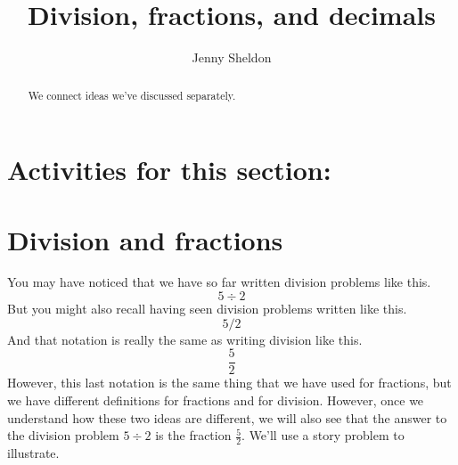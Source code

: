 \documentclass{ximera}
\title{Division, fractions, and decimals}
\author{Jenny Sheldon}
\begin{document}
\begin{abstract}
We connect ideas we've discussed separately.
\end{abstract}
\maketitle

\section{Activities for this section:} 

\section{Division and fractions}

You may have noticed that we have so far written division problems like this.
\[
5 \div 2
\]
But you might also recall having seen division problems written like this.
\[
5 / 2
\]
And that notation is really the same as writing division like this.
\[
\frac{5}{2}
\]
However, this last notation is the same thing that we have used for fractions, but we have  different definitions for fractions and for division. However, once we understand how these two ideas are different, we will also see that the answer to the division problem $5 \div 2$ is  the fraction $\frac{5}{2}$. We'll use a story problem to illustrate.
\end{document}
